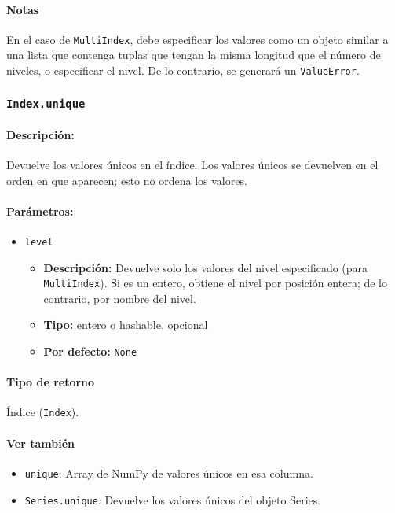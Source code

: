     \paragraph{Notas}
    En el caso de \texttt{MultiIndex}, debe especificar los valores como un objeto similar a una lista que contenga tuplas que tengan la misma longitud que el número de niveles, o especificar el nivel. De lo contrario, se generará un \texttt{ValueError}.





    \subsubsection{\texttt{Index.unique}}

    \paragraph{Descripción:}
    Devuelve los valores únicos en el índice. Los valores únicos se devuelven en el orden en que aparecen; esto no ordena los valores.

    \paragraph{Parámetros:}

    \begin{itemize}
        \item \texttt{level}
            \begin{itemize}
                \item \textbf{Descripción:} Devuelve solo los valores del nivel especificado (para \texttt{MultiIndex}). Si es un entero, obtiene el nivel por posición entera; de lo contrario, por nombre del nivel.
                \item \textbf{Tipo:} entero o hashable, opcional
                \item \textbf{Por defecto:} \texttt{None}
            \end{itemize}
    \end{itemize}

    \paragraph{Tipo de retorno}
    Índice (\texttt{Index}).

    \paragraph{Ver también}
    \begin{itemize}
        \item \texttt{unique}: Array de NumPy de valores únicos en esa columna.
        \item \texttt{Series.unique}: Devuelve los valores únicos del objeto Series.
    \end{itemize}



